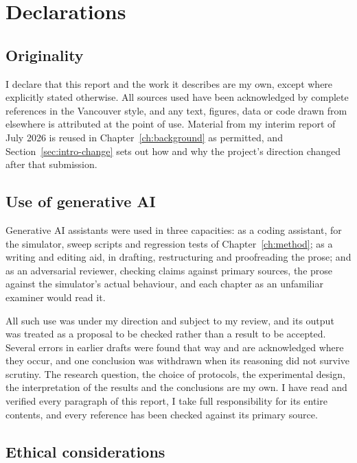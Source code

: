 \chapter*{Declarations}

\section*{Originality}

I declare that this report and the work it describes are my own, except where explicitly
stated otherwise. All sources used have been acknowledged by complete references in the
Vancouver style, and any text, figures, data or code drawn from elsewhere is attributed at
the point of use. Material from my interim report of July 2026 is reused in
Chapter~\ref{ch:background} as permitted, and Section~\ref{sec:intro-change} sets out how
and why the project's direction changed after that submission.

\section*{Use of generative AI}

Generative AI assistants were used in three capacities: as a coding assistant, for the
simulator, sweep scripts and regression tests of Chapter~\ref{ch:method}; as a writing and
editing aid, in drafting, restructuring and proofreading the prose; and as an adversarial
reviewer, checking claims against primary sources, the prose against the simulator's actual
behaviour, and each chapter as an unfamiliar examiner would read it.

All such use was under my direction and subject to my review, and its output was treated as
a proposal to be checked rather than a result to be accepted. Several errors in earlier
drafts were found that way and are acknowledged where they occur, and one conclusion was
withdrawn when its reasoning did not survive scrutiny. The research question, the choice of
protocols, the experimental design, the interpretation of the results and the conclusions
are my own. I have read and verified every paragraph of this report, I take full
responsibility for its entire contents, and every reference has been checked against its
primary source.

\section*{Ethical considerations}


